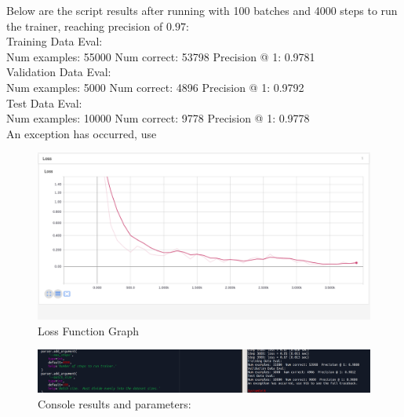 \documentclass[12pt]{article}
\begin{document}
Below are the script results after running with 100 batches and 4000 steps to run the trainer, reaching precision of $0.97$:\\

Training Data Eval:\\
Num examples: 55000  Num correct: 53798  Precision @ 1: 0.9781\\
Validation Data Eval:\\
Num examples: 5000  Num correct: 4896  Precision @ 1: 0.9792\\
Test Data Eval:\\
Num examples: 10000  Num correct: 9778  Precision @ 1: 0.9778\\
An exception has occurred, use \\

\begin{figure}[H]
\caption{Loss Function Graph}
\centering
  \includegraphics[width=\linewidth]{Loss.png}
\end{figure}


\begin{figure}[H]
\caption{Console results and parameters:}
\centering
  \includegraphics[width=\linewidth]{spyder-console.png}
\end{figure}
\end{document}
